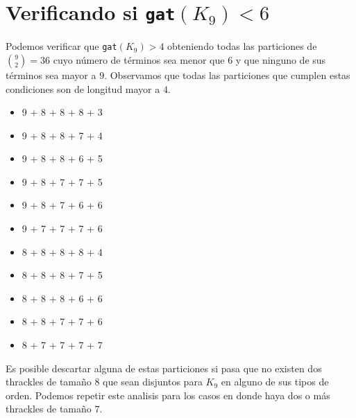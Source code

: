 \documentclass[12pt, letterpaper]{article}
\begin{document}
\section{Verificando si \texttt{gat}$(K_9) < 6$}
Podemos verificar que \texttt{gat}$(K_9) > 4$ obteniendo todas las particiones de $\binom{9}{2} = 36$ cuyo
número de términos sea menor que $6$ y que ninguno de sus términos sea mayor a $9$.
Observamos que todas las particiones que cumplen estas condiciones son de longitud mayor a $4$.
\begin{itemize}
  \item 9 + 8 + 8 + 8 + 3
  \item 9 + 8 + 8 + 7 + 4
  \item 9 + 8 + 8 + 6 + 5
  \item 9 + 8 + 7 + 7 + 5
  \item 9 + 8 + 7 + 6 + 6
  \item 9 + 7 + 7 + 7 + 6
  \item 8 + 8 + 8 + 8 + 4
  \item 8 + 8 + 8 + 7 + 5
  \item 8 + 8 + 8 + 6 + 6
  \item 8 + 8 + 7 + 7 + 6
  \item 8 + 7 + 7 + 7 + 7
\end{itemize}

Es posible descartar alguna de estas particiones si pasa que no existen dos thrackles de tamaño $8$ que sean disjuntos
para $K_9$ en alguno de sus tipos de orden. Podemos repetir este analisis para los casos en donde haya dos o más thrackles
de tamaño $7$.
\end{document}
